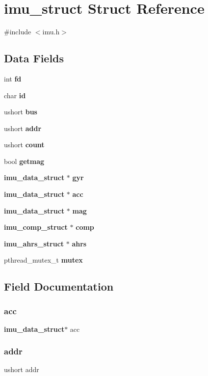 \section{imu\+\_\+struct Struct Reference}
\label{structimu__struct}


{\ttfamily \#include $<$imu.\+h$>$}

\subsection*{Data Fields}
\begin{DoxyCompactItemize}
\item 
int \textbf{ fd}
\item 
char \textbf{ id}
\item 
ushort \textbf{ bus}
\item 
ushort \textbf{ addr}
\item 
ushort \textbf{ count}
\item 
bool \textbf{ getmag}
\item 
\textbf{ imu\+\_\+data\+\_\+struct} $\ast$ \textbf{ gyr}
\item 
\textbf{ imu\+\_\+data\+\_\+struct} $\ast$ \textbf{ acc}
\item 
\textbf{ imu\+\_\+data\+\_\+struct} $\ast$ \textbf{ mag}
\item 
\textbf{ imu\+\_\+comp\+\_\+struct} $\ast$ \textbf{ comp}
\item 
\textbf{ imu\+\_\+ahrs\+\_\+struct} $\ast$ \textbf{ ahrs}
\item 
pthread\+\_\+mutex\+\_\+t \textbf{ mutex}
\end{DoxyCompactItemize}


\subsection{Field Documentation}
\mbox{\label{structimu__struct_a0b6ebaa39d3d73e344f071c883634c78}} 
\subsubsection{acc}
{\footnotesize\ttfamily \textbf{ imu\+\_\+data\+\_\+struct}$\ast$ acc}

\mbox{\label{structimu__struct_a59f58ef4a5fde5e53de0a6393643cedd}} 
\subsubsection{addr}
{\footnotesize\ttfamily ushort addr}

